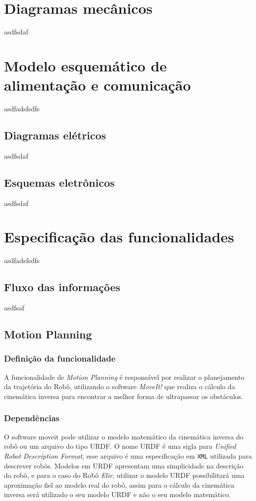 \section{Diagramas mecânicos}
\label{sec:diagm}
asdfsdaf

\section{Modelo esquemático de alimentação e comunicação}
\label{sec:modesq}
asdfadsfsdfs

\subsection{Diagramas elétricos}
\label{sec:diage}
asdfsdaf

\subsection{Esquemas eletrônicos}
\label{ssec:esqe}
asdfsdaf

\section{Especificação das funcionalidades}
\label{sec:espf}
asdfadsfsdfs

\subsection{Fluxo das informações}
\label{ssec:fluxo}
asdfsaf

\subsection{Motion Planning}
\label{ssec:motion}
\subsubsection{Definição da funcionalidade}
A funcionalidade de \textit{Motion Planning} é responsável por realizar o planejamento da trajetória do Robô, utilizando o software \textit{MoveIt!} que realiza o cálculo da cinemática inversa para encontrar a melhor forma de ultrapassar os obstáculos.
\subsubsection{Dependências}
O software moveit pode utilizar o modelo matemático da cinemática inversa do robô ou um arquivo do tipo URDF.
O nome URDF é uma sigla para \textit{Unified Robot Description Format}, esse arquivo é uma especificação em \verb|XML| utilizada para descrever robôs. Modelos em URDF apresentam uma simplicidade na descrição do robô, e para o caso do Robô \textit{Elir}, utilizar o modelo URDF possibilitará uma aproximação fiel ao modelo real do robô, assim para o cálculo da cinemática inversa será utilizado o seu modelo URDF e não o seu modelo matemático.

